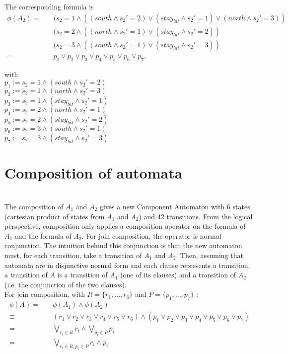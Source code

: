 \noindent
The corresponding formula is
\begin{align*}
\phi(A_2) =  & \quad ( s_2=1 \land ((south \land s_2'=2) \lor (stay_{lat}\land s_2'=1) \lor (north \land s_2'=3))  \\
&\quad( s_2=2 \land ((north \land s_2'=1) \lor (stay_{lat}\land s_2'=2)) \\
&\quad( s_2=3 \land ((south \land s_2'=1) \lor (stay_{lat}\land s_2'=3)) \\
=  &\quad p_1 \lor p_2 \lor p_3 \lor p_4 \lor p_5 \lor p_6 \lor p_7 ,
\end{align*}

\noindent
with\\
$p_1 := s_2=1 \land (south \land s_2'=2)$\\ \quad
$p_2 := s_2=1 \land (north \land s_2'=3)$\\ \quad
$p_3 := s_2=1 \land (stay_{lat}\land s_2'=1)$\\ \quad
$p_4 := s_2=2 \land (north \land s_2'=1) $\\ \quad
$p_5 := s_2=2 \land (stay_{lat}\land s_2'=2)$\\ \quad
$p_6 := s_2=3 \land (south \land s_2'=1) $\\ \quad
$p_7 := s_2=3 \land (stay_{lat}\land s_2'=3) $\\ \quad


\section{Composition of automata} \hspace{0pt} \\

The composition of $A_1$ and $A_2$ gives a new Component Automaton with 6 states (cartesian product of states from $A_1$ and $A_2$) and 42 transitions. From the logical perspective, composition only applies a composition operator on the formula of $A_1$ and the formula of $A_2$. 
For join composition, the operator is normal conjunction. The intuition behind this conjunction is that the new automaton must, for each transition, take a transition of $A_1$ and $A_2$. Then, assuming that automata are in disjunctive normal form and each clause represents a transition, a transition of $A$ is a transition of $A_1$ (one of its clauses) and a transition of $A_2$ (i.e. the conjunction of the two clauses). \\

For join composition, with $R = \{r_1, ..., r_6\}$ and $P=\{p_1, ...,p_7\}$  :
\begin{align*}
\phi(A)= &\quad \phi(A_1) \land \phi(A_2)\\
\equiv & \quad (r_1 \lor r_2 \lor r_3 \lor r_4 \lor r_5 \lor r_6 ) \land (p_1 \lor p_2 \lor p_3 \lor p_4 \lor p_5 \lor p_6 \lor p_7)\\
= & \quad \bigvee_{r_{i} \in R}r_i \land \bigvee_{p_i \in P} p_i\\
= & \quad \bigvee_{r_{i} \in R, p_i \in P}r_i \land p_i
\end{align*}

